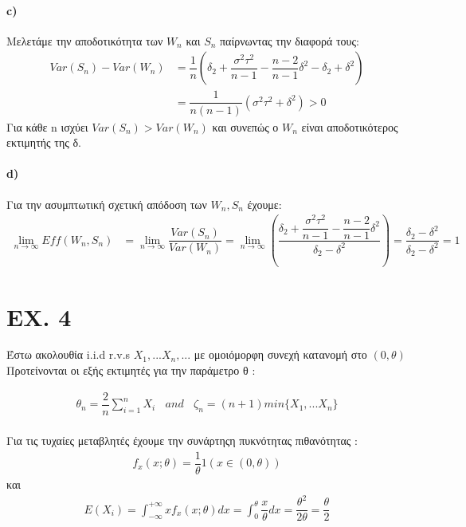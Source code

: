 \documentclass{article}
\begin{document}
\paragraph{c)}
Μελετάμε την αποδοτικότητα των $W_{n}$ και $S_{n}$ παίρνωντας την διαφορά τους:\\
\begin{align*}
Var(S_{n})-Var(W_{n})&= \dfrac{1}{n}(\delta_{2}+\dfrac{\sigma^{2}\tau^{2}}{n-1}-\dfrac{n-2}{n-1}\delta^{2}-\delta_{2}+\delta^{2}) \\
&=\dfrac{1}{n(n-1)}({\sigma^{2}\tau^{2}}+\delta^{2})>0
\end{align*}
Για κάθε n ισχύει $Var(S_{n})>Var(W_{n})$ και συνεπώς ο $W_{n}$ είναι αποδοτικότερος εκτιμητής της δ.

\paragraph{d)}
Για την ασυμπτωτική σχετική απόδοση των $W_{n} ,S_{n}$ έχουμε:\\

\begin{align*}
\lim_{n \to \infty}Eff(W_{n} ,S_{n}) &=\lim_{n \to \infty}\dfrac{Var(S_{n})}{Var(W_{n})}=\lim_{n \to \infty}(\dfrac{\delta_{2}+\dfrac{\sigma^{2}\tau^{2}}{n-1}-\dfrac{n-2}{n-1}\delta^{2}}{\delta_{2}-\delta^{2}})=\dfrac{\delta_{2}-\delta^{2}}{\delta_{2}-\delta^{2}}=1
\end{align*}

\newpage
\section*{EX. 4}
Έστω ακολουθία i.i.d r.v.s $X_{1},...X_{n},...$ με ομοιόμορφη συνεχή κατανομή στο $(0,\theta)$ \\
Προτείνονται οι εξής εκτιμητές για την παράμετρο θ :

\begin{align*}
\theta_{n}=\dfrac{2}{n}\sum_{i=1}^{n} X_{i} ~~~~and~~~~ \zeta_{n}=(n+1)min\lbrace X_{1},...X_{n} \rbrace
\end{align*}
\\
Για τις τυχαίες μεταβλητές έχουμε την συνάρτηςη πυκνότητας πιθανότητας :
\\
\begin{align*}
f_{x}(x ; \theta)=\dfrac{1}{\theta}1(x \in (0,\theta))
\end{align*}
και
\begin{align*}
E(X_{i})=\int_{-\infty}^{+\infty} xf_{x}(x ; \theta)dx=\int_{0}^{\theta}\dfrac{x}{\theta}dx=\dfrac{\theta^{2}}{2\theta}=\dfrac{\theta}{2}
\end{align*}
\\
\end{document}
